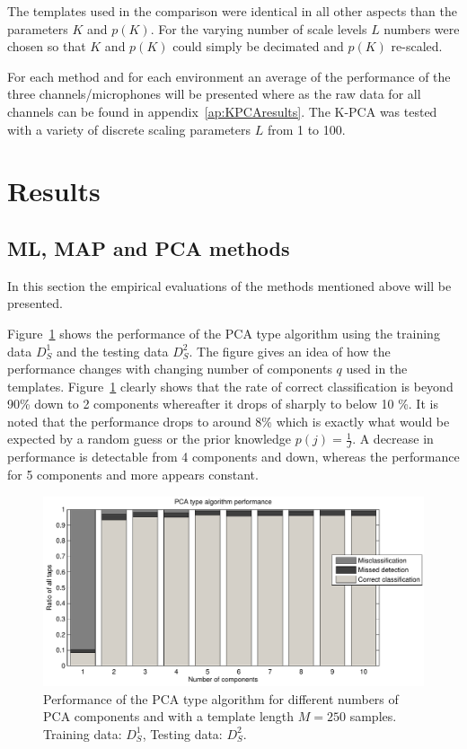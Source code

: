 The templates used in the comparison were identical in all other aspects than the parameters $K$ and $p(K)$. For the varying number of scale levels $L$ numbers were chosen so that $K$ and $p(K)$ could simply be decimated and $p(K)$ re-scaled.

For each method and for each environment an average of the performance of the three channels/microphones will be presented where as the raw data for all channels can be found in appendix~\ref{ap:KPCAresults}. The K-PCA was tested with a variety of discrete scaling parameters $L$ from 1 to 100.

\section{Results}\label{sec:results}
\subsection{ML, MAP and PCA methods}
In this section the empirical evaluations of the methods mentioned above will be presented.

Figure~\ref{fig:PCAperform} shows the performance of the PCA type algorithm using the training data $D^1_S$ and the testing data $D^2_S$. The figure gives an idea of how the performance changes with changing number of components $q$ used in the templates. Figure~\ref{fig:PCAperform} clearly shows that the rate of correct classification is beyond 90\% down to 2 components whereafter it drops of sharply to below 10 \%. It is noted that the performance drops to around 8\% which is exactly what would be expected by a random guess or the prior knowledge $p(j)= \frac{1}{J}$. A decrease in performance is detectable from 4 components and down, whereas the performance for 5 components and more appears constant.

\begin{figure}[!] %
\centering
\includegraphics[width=150mm]{PCAperform.pdf}
\caption{Performance of the PCA type algorithm for different numbers of PCA components and with a template length $M=250$ samples. Training data: $D^1_S$, Testing data: $D^2_S$.}\label{fig:PCAperform}
\end{figure}

